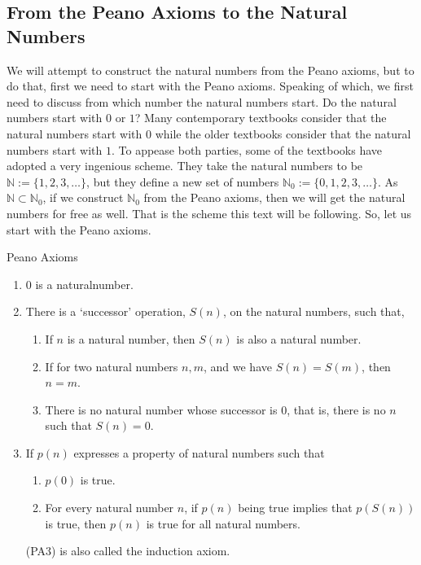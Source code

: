 \subsection{From the Peano Axioms to the Natural Numbers}
We will attempt to construct the natural numbers from the Peano axioms, but to do that, first we need to start with the Peano axioms. Speaking of which, we first need to discuss from which number the natural numbers start. Do the natural numbers start with $0$ or $1$? Many contemporary textbooks consider that the natural numbers start with $0$ while the older textbooks consider that the natural numbers start with $1$. To appease both parties, some of the textbooks have adopted a very ingenious scheme. They take the natural numbers to be $\mathbb{N}:=\{1,2,3,\dots\}$, but they define a new set of numbers $\mathbb{N}_0:=\{0,1,2,3,\dots\}$. As $\mathbb{N}\subset\mathbb{N}_0$, if we construct $\mathbb{N}_0$ from the Peano axioms, then we will get the natural numbers for free as well. That is the scheme this text will be following. So, let us start with the Peano axioms.
\begin{Definition}{Peano Axioms}\label{peano_axioms}
	\begin{enumerate}[leftmargin=1.25cm]
		\item[\textbf{(PA1)}] $0$ is a natural\footnotemark number.
		\item[\textbf{(PA2)}] There is a `successor' operation, $S(n)$, on the natural numbers, such that,
		\begin{enumerate}
			\item If $n$ is a natural number, then $S(n)$ is also a natural number.
			\item If for two natural numbers $n,m$, and we have $S(n)=S(m)$, then $n=m$.
			\item There is no natural number whose successor is $0$, that is, there is no $n$ such that $S(n)=0$.
		\end{enumerate}
		\item[\textbf{(PA3)}] If $p(n)$ expresses a property of natural numbers such that
		\begin{enumerate}
			\item $p(0)$ is true.
			\item For every natural number $n$, if $p(n)$ being true implies that $p(S(n))$ is true, then $p(n)$ is true for all natural numbers.
		\end{enumerate}
		(PA3) is also called the induction axiom.
	\end{enumerate}
\end{Definition}
